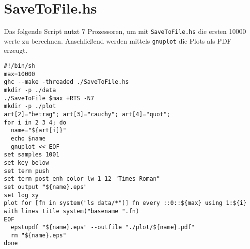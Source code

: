 \begin{comment}
\begin{align*}
v(t)&=
  \frac{1}{2}t^{-1}+
  \frac{3}{4}it^{0}+
  \frac{3}{2}t^{1}+
  \frac{-63}{16}it^{2}+
  \frac{-27}{2}t^{3}+
  \frac{1899}{32}it^{4}+
  \frac{324}{1}t^{5}+
  \frac{-543483}{256}it^{6}+
\\&\qquad\frac{-32427}{2}t^{7}+
  \frac{72251109}{512}it^{8}+
  \frac{2752623}{2}t^{9}+
  \frac{-30413055339}{2048}it^{10}+
  \frac{-175490226}{1}t^{11}+
\\&\qquad\frac{9228545313147}{4096}it^{12}+
  \frac{31217145174}{1}t^{13}+
  \frac{-30419533530730323}{65536}it^{14}+
\\&\qquad\frac{-14741904895227}{2}t^{15}+
  \frac{16317191917079376129}{131072}it^{16}+
  \frac{4456057685561073}{2}t^{17}+
\\&\qquad\frac{-22082325223708363779009}{524288}it^{18}+
  \frac{-1677161966915352627}{2}t^{19}+
\\&\qquad\frac{18391039987731669876160557}{1048576}it^{20}+
  \frac{384452768592440499024}{1}t^{21}+
\\&\qquad\frac{-73930258776609869550094166319}{8388608}it^{22}+
  \frac{-210878717949731493002826}{1}t^{23}+
\\&\qquad\frac{88204980719873920964105544038937}{16777216}it^{24}+
  \frac{136346686011011135869054074}{1}t^{25}+
\\&\qquad\frac{-246474684300724210330466557670749827}{67108864}it^{26}+
\\&\qquad\frac{-102614997677451303311734530276}{1}t^{27}+
\\&\qquad\frac{398608966820777951112056743321778108571}{134217728}it^{28}+
\\&\qquad\frac{88929857099067937229443324337874}{1}t^{29}+
\\&\qquad\frac{-11819876688678190917510659802435441505814403}{4294967296}it^{30}+
  \dots
\end{align*}
\end{comment}

\section{SaveToFile.hs}

Das folgende Script nutzt 7 Prozessoren, um mit \texttt{SaveToFile.hs} die
ersten 10000 werte zu berechnen. Anschließend werden mittels \texttt{gnuplot}
die Plots als PDF erzeugt.
\begin{lstlisting}[style=Bash,caption=GeneratePlots.sh]
#!/bin/sh
max=10000
ghc --make -threaded ./SaveToFile.hs
mkdir -p ./data
./SaveToFile $max +RTS -N7
mkdir -p ./plot
art[2]="betrag"; art[3]="cauchy"; art[4]="quot";
for i in 2 3 4; do
  name="${art[i]}"
  echo $name
  gnuplot << EOF
set samples 1001
set key below
set term push
set term post enh color lw 1 12 "Times-Roman"
set output "${name}.eps"
set log xy
plot for [fn in system("ls data/*")] fn every ::0::${max} using 1:${i} with lines title system("basename ".fn)
EOF
  epstopdf "${name}.eps" --outfile "./plot/${name}.pdf"
  rm "${name}.eps"
done
\end{lstlisting}

